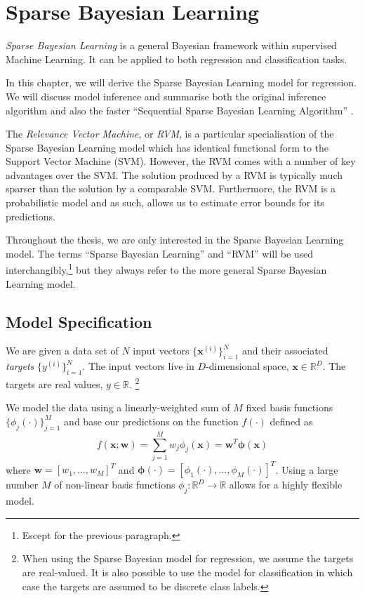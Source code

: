 \chapter{Sparse Bayesian Learning}
\label{ch:rvm}
\emph{Sparse Bayesian Learning} \cite{tipping2001} is a general Bayesian framework within supervised Machine Learning. 
It can be applied to both regression and classification tasks.

In this chapter, we will derive the Sparse Bayesian Learning model for regression.
We will discuss model inference and summarise both the original inference algorithm \cite{tipping2001} and also the faster ``Sequential Sparse Bayesian Learning Algorithm'' \cite{tipping2003}.

The \emph{Relevance Vector Machine}, or \emph{RVM}, is a particular specialisation of the Sparse Bayesian Learning model which has identical functional form to the Support Vector Machine (SVM).
However, the RVM comes with a number of key advantages over the SVM. 
The solution produced by a RVM is typically much sparser than the solution by a comparable SVM.
Furthermore, the RVM is a probabilistic model and as such, allows us to estimate error bounds for its predictions.

Throughout the thesis, we are only interested in the Sparse Bayesian Learning model.
The terms ``Sparse Bayesian Learning'' and ``RVM'' will be used interchangibly,\footnote{Escept for the previous paragraph.}
but they always refer to the more general Sparse Bayesian Learning model.

\section{Model Specification}
We are given a data set of $N$ input vectors $\{\bm x^{(i)}\}^N_{i=1}$ and their associated \emph{targets} $\{y^{(i)}\}_{i=1}^N$.
The input vectors live in $D$-dimensional space, $\bm x \in \mathbb{R}^D$.
The targets are real values, $y \in \mathbb{R}$.
\footnote{When using the Sparse Bayesian model for regression, we assume the targets are real-valued.
  It is also possible to use the model for classification in which case the targets are assumed to be discrete class labels.
}

We model the data using a linearly-weighted sum of $M$ fixed basis functions $\{\phi_j(\cdot)\}_{j=1}^M$ and base our predictions on the function $f(\cdot)$ defined as
\begin{equation} 
  \label{rvm:function}
  f(\bm x; \bm w) = \sum_{j=1}^M w_j \phi_j(\bm x) = \bm w^T \bm \phi(\bm x)
\end{equation}
where $\bm w = [w_1, \dots, w_M]^T$ and $\bm \phi(\cdot) = [\phi_1(\cdot), \dots, \phi_M(\cdot)]^T$.
Using a large number $M$ of non-linear basis functions $\phi_j : \mathbb{R}^D \to \mathbb{R}$ allows for a highly flexible model. 

